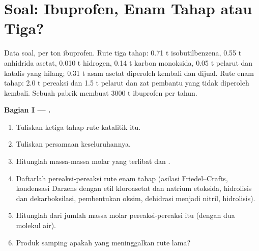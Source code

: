 \clearpage
\enlargethispage{3\baselineskip}
\section{Soal: Ibuprofen, Enam Tahap atau Tiga?}

\begin{problem}
\label{pb:b3:green-industrial:1}
Data soal, per ton ibuprofen. Rute tiga tahap: 0.71 t
isobutilbenzena, 0.55 t anhidrida asetat, 0.010 t hidrogen, 0.14 t karbon
monoksida, 0.05 t pelarut dan katalis yang hilang; 0.31 t asam asetat diperoleh kembali
dan dijual. Rute enam tahap: 2.0 t pereaksi dan 1.5 t pelarut dan zat pembantu
yang tidak diperoleh kembali. Sebuah pabrik membuat 3000 t ibuprofen per tahun.

\medskip\noindent\textbf{Bagian I --- .}
\begin{enumerate}[beginpenalty=10000]
  \item Tuliskan ketiga tahap rute katalitik itu.
  \item Tuliskan persamaan keseluruhannya.
  \item Hitunglah massa-massa molar yang terlibat dan .
  \item Daftarlah pereaksi-pereaksi rute enam tahap (asilasi Friedel--Crafts, kondensasi
        Darzens dengan etil kloroasetat dan natrium etoksida, hidrolisis dan
        dekarboksilasi, pembentukan oksim, dehidrasi menjadi nitril, hidrolisis).
  \item Hitunglah  dari jumlah massa molar pereaksi-pereaksi itu (dengan dua
        molekul air).
  \item Produk samping apakah yang meninggalkan rute lama?
\end{enumerate}


\end{problem}
